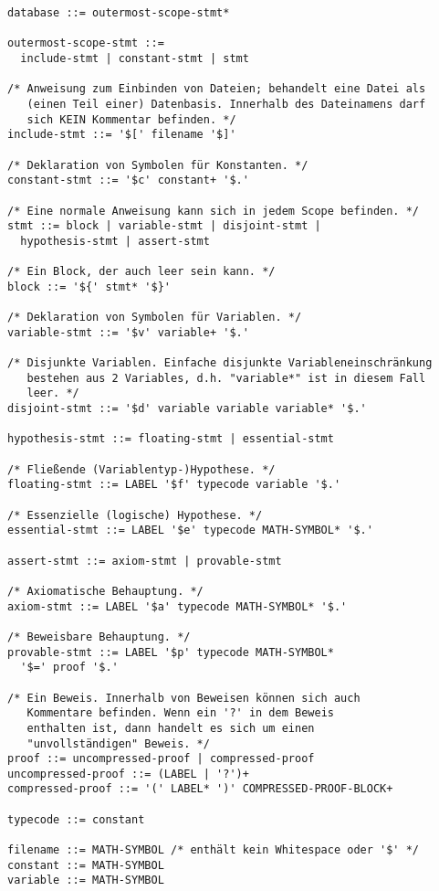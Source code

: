 \begin{verbatim}
database ::= outermost-scope-stmt*

outermost-scope-stmt ::=
  include-stmt | constant-stmt | stmt

/* Anweisung zum Einbinden von Dateien; behandelt eine Datei als
   (einen Teil einer) Datenbasis. Innerhalb des Dateinamens darf
   sich KEIN Kommentar befinden. */
include-stmt ::= '$[' filename '$]'

/* Deklaration von Symbolen für Konstanten. */
constant-stmt ::= '$c' constant+ '$.'

/* Eine normale Anweisung kann sich in jedem Scope befinden. */
stmt ::= block | variable-stmt | disjoint-stmt |
  hypothesis-stmt | assert-stmt

/* Ein Block, der auch leer sein kann. */
block ::= '${' stmt* '$}'

/* Deklaration von Symbolen für Variablen. */
variable-stmt ::= '$v' variable+ '$.'

/* Disjunkte Variablen. Einfache disjunkte Variableneinschränkung
   bestehen aus 2 Variables, d.h. "variable*" ist in diesem Fall 
   leer. */
disjoint-stmt ::= '$d' variable variable variable* '$.'

hypothesis-stmt ::= floating-stmt | essential-stmt

/* Fließende (Variablentyp-)Hypothese. */
floating-stmt ::= LABEL '$f' typecode variable '$.'

/* Essenzielle (logische) Hypothese. */
essential-stmt ::= LABEL '$e' typecode MATH-SYMBOL* '$.'

assert-stmt ::= axiom-stmt | provable-stmt

/* Axiomatische Behauptung. */
axiom-stmt ::= LABEL '$a' typecode MATH-SYMBOL* '$.'

/* Beweisbare Behauptung. */
provable-stmt ::= LABEL '$p' typecode MATH-SYMBOL*
  '$=' proof '$.'

/* Ein Beweis. Innerhalb von Beweisen können sich auch
   Kommentare befinden. Wenn ein '?' in dem Beweis 
   enthalten ist, dann handelt es sich um einen
   "unvollständigen" Beweis. */
proof ::= uncompressed-proof | compressed-proof
uncompressed-proof ::= (LABEL | '?')+
compressed-proof ::= '(' LABEL* ')' COMPRESSED-PROOF-BLOCK+

typecode ::= constant

filename ::= MATH-SYMBOL /* enthält kein Whitespace oder '$' */
constant ::= MATH-SYMBOL
variable ::= MATH-SYMBOL
\end{verbatim}

